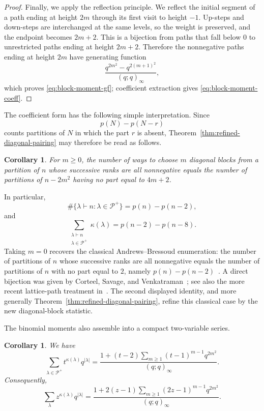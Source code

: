 \documentclass[11pt]{article}
\newtheorem{corollary}[theorem]{Corollary}
\theoremstyle{definition}
\theoremstyle{remark}
\begin{document}
\begin{proof}
Finally, we apply the reflection principle.  We reflect the initial segment of a path ending at height $2m$ through its first visit to height $-1$.  Up-steps and down-steps are interchanged at the same levels, so the weight is preserved, and the endpoint becomes $2m+2$.  This is a bijection from paths that fall below $0$ to unrestricted paths ending at height $2m+2$.  Therefore the nonnegative paths ending at height $2m$ have generating function
\[
 \frac{q^{2m^2}-q^{2(m+1)^2}}{(q;q)_\infty},
\]
which proves \eqref{eq:block-moment-gf}; coefficient extraction gives \eqref{eq:block-moment-coeff}.
\end{proof}

The coefficient form has the following simple interpretation.  Since
\[
 p(N)-p(N-r)
\]
counts partitions of $N$ in which the part $r$ is absent, Theorem~\ref{thm:refined-diagonal-pairing} may therefore be read as follows.

\begin{corollary}\label{cor:blocks-missing-part}
For $m\geq0$, the number of ways to choose $m$ diagonal blocks from a partition of $n$ whose successive ranks are all nonnegative equals the number of partitions of $n-2m^2$ having no part equal to $4m+2$.
\end{corollary}

In particular,
\[
 \#\{\lambda\vdash n:\lambda\in\mathcal P^+\}=p(n)-p(n-2),
\]
and
\[
 \sum_{\substack{\lambda\vdash n\\\lambda\in\mathcal P^+}}
 \kappa(\lambda)=p(n-2)-p(n-8).
\]
Taking $m=0$ recovers the classical Andrews--Bressoud enumeration: the number of partitions of $n$ whose successive ranks are all nonnegative equals the number of partitions of $n$ with no part equal to $2$, namely $p(n)-p(n-2)$~\cite{Andrews1972,Bressoud1980}.  A direct bijection was given by Corteel, Savage, and Venkatraman~\cite{CorteelSavageVenkatraman1998}; see also the more recent lattice-path treatment in~\cite{CorteelElizaldeSavage2023}.  The second displayed identity, and more generally Theorem~\ref{thm:refined-diagonal-pairing}, refine this classical case by the new diagonal-block statistic.

The binomial moments also assemble into a compact two-variable series.

\begin{corollary}\label{cor:block-distribution}
We have
\begin{equation}\label{eq:block-distribution-positive}
 \sum_{\lambda\in\mathcal P^+}t^{\kappa(\lambda)}q^{|\lambda|}
 =\frac{1+(t-2)\displaystyle\sum_{m\geq1}(t-1)^{m-1}q^{2m^2}}
 {(q;q)_\infty}.
\end{equation}
Consequently,
\begin{equation}\label{eq:block-distribution-all}
 \sum_{\lambda}z^{\kappa(\lambda)}q^{|\lambda|}
 =\frac{1+2(z-1)\displaystyle\sum_{m\geq1}(2z-1)^{m-1}q^{2m^2}}
 {(q;q)_\infty}.
\end{equation}
\end{corollary}
\end{document}

